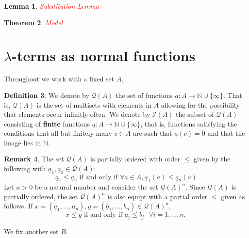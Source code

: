 \documentclass[12pt]{article}
\theoremstyle{plain}
\newtheorem{thm}{Theorem}[subsection] %
\newtheorem{lemma}[thm]{Lemma}
\theoremstyle{definition}
\newtheorem{defn}[thm]{Definition} %
\newtheorem{remark}[thm]{Remark}
\newcommand{\bb}[1]{\mathbb{#1}}
\newcommand{\call}[1]{\mathcal{#1}}
\newcommand{\Ical}{\call{I}}
\newcommand{\Qcal}{\call{Q}}
\newcommand{\lto}{\longrightarrow}
\begin{document}
\begin{lemma}
    \textcolor{red}{Substitution Lemma}
\end{lemma}

\begin{thm}
    \textcolor{red}{Model}
\end{thm}
	
\section{$\lambda$-terms as normal functions}\label{sec:new_model}
Throughout we work with a fixed set $A$.
	
	\begin{defn}
		We denote by $\Qcal(A)$ the set of functions $\underline{a}: A \lto \bb{N} \cup \{ \infty \}$. That is, $\Qcal(A)$ is the set of multisets with elements in $A$ allowing for the possibility that elements occur infinitly often. We denote by $\Ical(A)$ the subset of $\Qcal(A)$ consisting of \textbf{finite} functions $\underline{a}: A \lto \bb{N} \cup \{ \infty \}$, that is, functions satisfying the conditions that all but finitely many $c \in A$ are such that $\underline{a}(c) = 0$ and that the image lies in $\bb{N}$.
	\end{defn}
	
	\begin{remark}
		The set $\Qcal(A)$ is partially ordered with order $\leq$ given by the following with $\underline{a}_1, \underline{a}_2 \in \Qcal(A)$:
		\begin{equation}
			\underline{a}_1 \leq \underline{a}_2 \text{ if and only if }\forall a \in A, \underline{a}_1(a) \leq \underline{a}_2(a)
		\end{equation}
		Let $n > 0$ be a natural number and consider the set $\Qcal(A)^n$. Since $\Qcal(A)$ is partially ordered, the set $\Qcal(A)^n$ is also equipt with a partial order $\leq$ given as follows. If $x = (\underline{a}_1, \ldots, \underline{a_n}), y = (\underline{b}_1, \ldots, \underline{b_n}) \in \Qcal(A)^n$,
		\begin{equation}
			x \leq y\text{ if and only if }\underline{a}_i \leq \underline{b_i}\text{  }\forall i = 1, \ldots, n,
		\end{equation}
	\end{remark}
	
	We fix another set $B$.
	
\end{document}
